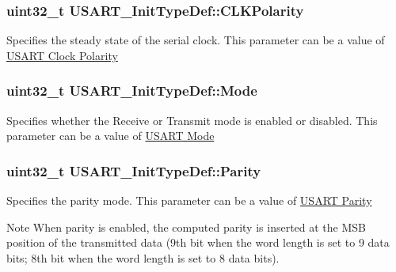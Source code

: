 \subsubsection[{\texorpdfstring{C\+L\+K\+Polarity}{CLKPolarity}}]{\setlength{\rightskip}{0pt plus 5cm}uint32\+\_\+t U\+S\+A\+R\+T\+\_\+\+Init\+Type\+Def\+::\+C\+L\+K\+Polarity}\hypertarget{struct_u_s_a_r_t___init_type_def_afc3f0418628e3eef91593a5122c049d3}{}\label{struct_u_s_a_r_t___init_type_def_afc3f0418628e3eef91593a5122c049d3}
Specifies the steady state of the serial clock. This parameter can be a value of \hyperlink{group___u_s_a_r_t___clock___polarity}{U\+S\+A\+RT Clock Polarity} 
\subsubsection[{\texorpdfstring{Mode}{Mode}}]{\setlength{\rightskip}{0pt plus 5cm}uint32\+\_\+t U\+S\+A\+R\+T\+\_\+\+Init\+Type\+Def\+::\+Mode}\hypertarget{struct_u_s_a_r_t___init_type_def_abd7e257f9d24a355ac9f720130d902ca}{}\label{struct_u_s_a_r_t___init_type_def_abd7e257f9d24a355ac9f720130d902ca}
Specifies whether the Receive or Transmit mode is enabled or disabled. This parameter can be a value of \hyperlink{group___u_s_a_r_t___mode}{U\+S\+A\+RT Mode} 
\subsubsection[{\texorpdfstring{Parity}{Parity}}]{\setlength{\rightskip}{0pt plus 5cm}uint32\+\_\+t U\+S\+A\+R\+T\+\_\+\+Init\+Type\+Def\+::\+Parity}\hypertarget{struct_u_s_a_r_t___init_type_def_a87eb81cdeb80ee5c3d96aecbe9e75612}{}\label{struct_u_s_a_r_t___init_type_def_a87eb81cdeb80ee5c3d96aecbe9e75612}
Specifies the parity mode. This parameter can be a value of \hyperlink{group___u_s_a_r_t___parity}{U\+S\+A\+RT Parity} \begin{DoxyNote}{Note}
When parity is enabled, the computed parity is inserted at the M\+SB position of the transmitted data (9th bit when the word length is set to 9 data bits; 8th bit when the word length is set to 8 data bits). 
\end{DoxyNote}
